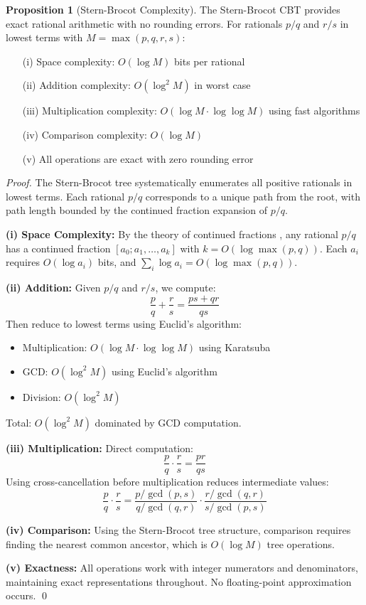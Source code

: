 \documentclass[11pt]{article}
\theoremstyle{definition}
\newtheorem{proposition}{Proposition}
\begin{document}
\begin{proposition}[Stern-Brocot Complexity]
\label{prop:stern-brocot}
The Stern-Brocot CBT provides exact rational arithmetic with no rounding errors. For rationals $p/q$ and $r/s$ in lowest terms with $M = \max(p, q, r, s)$:
\begin{enumerate}
\item[(i)] Space complexity: $O(\log M)$ bits per rational
\item[(ii)] Addition complexity: $O(\log^2 M)$ in worst case
\item[(iii)] Multiplication complexity: $O(\log M \cdot \log \log M)$ using fast algorithms
\item[(iv)] Comparison complexity: $O(\log M)$
\item[(v)] All operations are exact with zero rounding error
\end{enumerate}
\end{proposition}

\begin{proof}
The Stern-Brocot tree systematically enumerates all positive rationals in lowest terms. Each rational $p/q$ corresponds to a unique path from the root, with path length bounded by the continued fraction expansion of $p/q$.

\textbf{(i) Space Complexity:} By the theory of continued fractions \cite{graham1994concrete}, any rational $p/q$ has a continued fraction $[a_0; a_1, \ldots, a_k]$ with $k = O(\log \max(p,q))$. Each $a_i$ requires $O(\log a_i)$ bits, and $\sum_{i} \log a_i = O(\log \max(p,q))$.

\textbf{(ii) Addition:} Given $p/q$ and $r/s$, we compute:
\begin{equation}
\frac{p}{q} + \frac{r}{s} = \frac{ps + qr}{qs}
\end{equation}
Then reduce to lowest terms using Euclid's algorithm:
\begin{itemize}
\item Multiplication: $O(\log M \cdot \log \log M)$ using Karatsuba
\item GCD: $O(\log^2 M)$ using Euclid's algorithm
\item Division: $O(\log^2 M)$
\end{itemize}
Total: $O(\log^2 M)$ dominated by GCD computation.

\textbf{(iii) Multiplication:} Direct computation:
\begin{equation}
\frac{p}{q} \cdot \frac{r}{s} = \frac{pr}{qs}
\end{equation}
Using cross-cancellation before multiplication reduces intermediate values:
\begin{equation}
\frac{p}{q} \cdot \frac{r}{s} = \frac{p/\gcd(p,s)}{q/\gcd(q,r)} \cdot \frac{r/\gcd(q,r)}{s/\gcd(p,s)}
\end{equation}

\textbf{(iv) Comparison:} Using the Stern-Brocot tree structure, comparison requires finding the nearest common ancestor, which is $O(\log M)$ tree operations.

\textbf{(v) Exactness:} All operations work with integer numerators and denominators, maintaining exact representations throughout. No floating-point approximation occurs. \qed
\end{proof}
\end{document}
